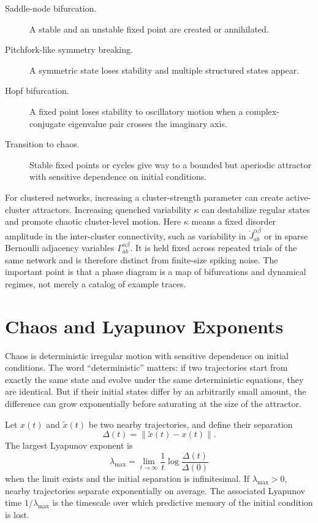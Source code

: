 \begin{description}
  \item[Saddle-node bifurcation.] A stable and an unstable fixed point are created or annihilated.
  \item[Pitchfork-like symmetry breaking.] A symmetric state loses stability and multiple structured states appear.
  \item[Hopf bifurcation.] A fixed point loses stability to oscillatory motion when a complex-conjugate eigenvalue pair crosses the imaginary axis.
  \item[Transition to chaos.] Stable fixed points or cycles give way to a bounded but aperiodic attractor with sensitive dependence on initial conditions.
\end{description}

For clustered networks, increasing a cluster-strength parameter can create active-cluster attractors. Increasing quenched variability $\kappa$ can destabilize regular states and promote chaotic cluster-level motion. Here $\kappa$ means a fixed disorder amplitude in the inter-cluster connectivity, such as variability in $\check{J}_{ab}^{\alpha\beta}$ or in sparse Bernoulli adjacency variables $\Gamma_{ab}^{\alpha\beta}$. It is held fixed across repeated trials of the same network and is therefore distinct from finite-size spiking noise. The important point is that a phase diagram is a map of bifurcations and dynamical regimes, not merely a catalog of example traces.

\section{Chaos and Lyapunov Exponents}
\label{sec:chaos-lyapunov}

Chaos is deterministic irregular motion with sensitive dependence on initial conditions. The word ``deterministic'' matters: if two trajectories start from exactly the same state and evolve under the same deterministic equations, they are identical. But if their initial states differ by an arbitrarily small amount, the difference can grow exponentially before saturating at the size of the attractor.

Let $x(t)$ and $\tilde{x}(t)$ be two nearby trajectories, and define their separation
%
\begin{equation}
  \Delta(t) = \|\tilde{x}(t)-x(t)\|.
  \label{eq:trajectory-separation}
\end{equation}
%
The largest Lyapunov exponent is
%
\begin{equation}
  \lambda_{\max}
  =
  \lim_{t\to\infty}
  \frac{1}{t}
  \log\frac{\Delta(t)}{\Delta(0)}
  \label{eq:largest-lyapunov}
\end{equation}
%
when the limit exists and the initial separation is infinitesimal. If $\lambda_{\max}>0$, nearby trajectories separate exponentially on average. The associated Lyapunov time $1/\lambda_{\max}$ is the timescale over which predictive memory of the initial condition is lost.

